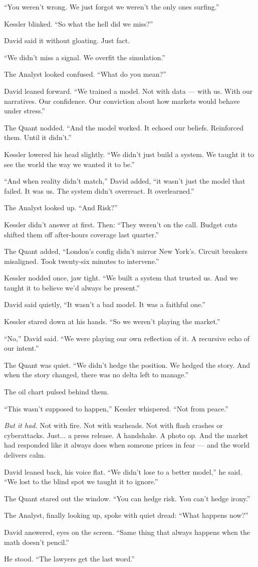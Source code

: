 “You weren’t wrong. We just forgot we weren’t the only ones surfing.”

Kessler blinked. “So what the hell did we miss?”

David said it without gloating. Just fact.

“We didn’t miss a signal. We overfit the simulation.”

The Analyst looked confused. “What do you mean?”

David leaned forward. “We trained a model. Not with data — with us. With our narratives. Our confidence. Our conviction about how markets would behave under stress.”

The Quant nodded. “And the model worked. It echoed our beliefs. Reinforced them. Until it didn’t.”

Kessler lowered his head slightly. “We didn’t just build a system. We taught it to see the world the way we wanted it to be.”

“And when reality didn’t match,” David added, “it wasn’t just the model that failed. It was us. The system didn’t overreact. It overlearned.”

The Analyst looked up. “And Risk?”

Kessler didn’t answer at first. Then: “They weren’t on the call. Budget cuts shifted them off after-hours coverage last quarter.”

The Quant added, “London's config didn’t mirror New York’s. Circuit breakers misaligned. Took twenty-six minutes to intervene.”

Kessler nodded once, jaw tight. “We built a system that trusted us. And we taught it to believe we’d always be present.”

David said quietly, “It wasn’t a bad model. It was a faithful one.”

Kessler stared down at his hands. “So we weren’t playing the market.”

“No,” David said. “We were playing our own reflection of it. A recursive echo of our intent.”

The Quant was quiet. “We didn't hedge the position. We hedged the story. And when the story changed, there was no delta left to manage.”

The oil chart pulsed behind them.

“This wasn’t supposed to happen,” Kessler whispered. “Not from peace.”

\textit{But it had.}
Not with fire. Not with warheads. Not with flash crashes or cyberattacks.
Just... a press release. A handshake. A photo op.
And the market had responded like it always does when someone prices in fear — and the world delivers calm.

David leaned back, his voice flat.
“We didn’t lose to a better model,” he said. “We lost to the blind spot we taught it to ignore.”

The Quant stared out the window. “You can hedge risk. You can’t hedge irony.”

The Analyst, finally looking up, spoke with quiet dread:
“What happens now?”

David answered, eyes on the screen. “Same thing that always happens when the math doesn’t pencil.”

He stood. “The lawyers get the last word.”